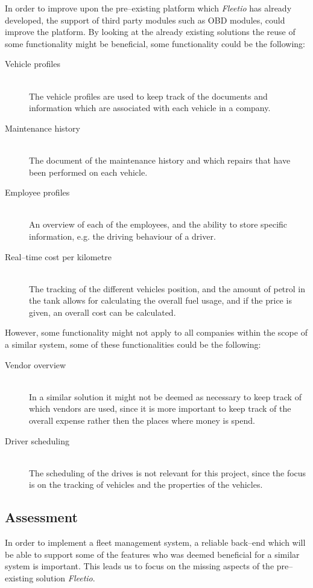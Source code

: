 In order to improve upon the pre--existing platform which \textit{Fleetio} has already developed, the support of third party modules such as \ac{OBD} modules, could improve the platform.
By looking at the already existing solutions the reuse of some functionality might be beneficial, some functionality could be the following:
\begin{description}
    \item[Vehicle profiles] \hfill \\
    The vehicle profiles are used to keep track of the documents and information which are associated with each vehicle in a company.
    \item[Maintenance history] \hfill \\
    The document of the maintenance history and which repairs that have been performed on each vehicle.
    \item[Employee profiles] \hfill \\
    An overview of each of the employees, and the ability to store specific information, e.g. the driving behaviour of a driver.
    \item[Real--time cost per kilometre] \hfill \\
    The tracking of the different vehicles position, and the amount of petrol in the tank allows for calculating the overall fuel usage, and if the price is given, an overall cost can be calculated.
\end{description}

However, some functionality might not apply to all companies within the scope of a similar system, some of these functionalities could be the following:
\begin{description}
    \item[Vendor overview] \hfill \\
    In a similar solution it might not be deemed as necessary to keep track of which vendors are used, since it is more important to keep track of the overall expense rather then the places where money is spend.
    \item[Driver scheduling] \hfill \\
    The scheduling of the drives is not relevant for this project, since the focus is on the tracking of vehicles and the properties of the vehicles.
\end{description}

\subsection{Assessment}\label{sub:Assessment}
In order to implement a fleet management system, a reliable back--end which will be able to support some of the features who was deemed beneficial for a similar system is important.
This leads us to focus on the missing aspects of the pre--existing solution \textit{Fleetio}.


